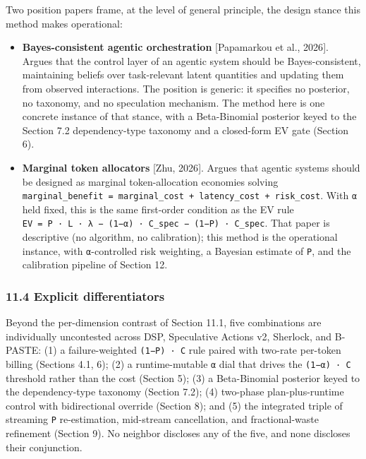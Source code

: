 \documentclass[
  11pt,
]{article}
\newcounter{none} %
\providecommand{\tightlist}{%
  \setlength{\itemsep}{0pt}\setlength{\parskip}{0pt}}
\begin{document}
Two position papers frame, at the level of general principle, the design
stance this method makes operational:

\begin{itemize}
\tightlist
\item
  \textbf{Bayes-consistent agentic orchestration} {[}Papamarkou et al.,
  2026{]}. Argues that the control layer of an agentic system should be
  Bayes-consistent, maintaining beliefs over task-relevant latent
  quantities and updating them from observed interactions. The position
  is generic: it specifies no posterior, no taxonomy, and no speculation
  mechanism. The method here is one concrete instance of that stance,
  with a Beta-Binomial posterior keyed to the Section 7.2
  dependency-type taxonomy and a closed-form EV gate (Section 6).
\item
  \textbf{Marginal token allocators} {[}Zhu, 2026{]}. Argues that
  agentic systems should be designed as marginal token-allocation
  economies solving
  \texttt{marginal\_benefit\ =\ marginal\_cost\ +\ latency\_cost\ +\ risk\_cost}.
  With \texttt{α} held fixed, this is the same first-order condition as
  the EV rule
  \texttt{EV\ =\ P\ ·\ L\ ·\ λ\ −\ (1−α)\ ·\ C\_spec\ −\ (1−P)\ ·\ C\_spec}.
  That paper is descriptive (no algorithm, no calibration); this method
  is the operational instance, with \texttt{α}-controlled risk
  weighting, a Bayesian estimate of \texttt{P}, and the calibration
  pipeline of Section 12.
\end{itemize}

\subsubsection{11.4 Explicit
differentiators}\label{explicit-differentiators}

Beyond the per-dimension contrast of Section 11.1, five combinations are
individually uncontested across DSP, Speculative Actions v2, Sherlock,
and B-PASTE: (1) a failure-weighted \texttt{(1−P)\ ·\ C} rule paired
with two-rate per-token billing (Sections 4.1, 6); (2) a runtime-mutable
\texttt{α} dial that drives the \texttt{(1−α)\ ·\ C} threshold rather
than the cost (Section 5); (3) a Beta-Binomial posterior keyed to the
dependency-type taxonomy (Section 7.2); (4) two-phase plan-plus-runtime
control with bidirectional override (Section 8); and (5) the integrated
triple of streaming \texttt{P} re-estimation, mid-stream cancellation,
and fractional-waste refinement (Section 9). No neighbor discloses any
of the five, and none discloses their conjunction.
\end{document}
